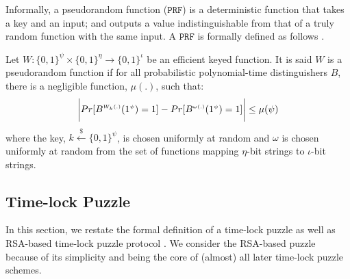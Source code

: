 Informally, a pseudorandom function ($\mathtt{PRF}$) is a deterministic function that takes a key and an input; and outputs a value  indistinguishable from that of  a truly random function with the same input.   A $\mathtt{PRF}$ is formally defined as follows \cite{DBLP:books/crc/KatzLindell2007}. 
\begin{definition} Let $W:\{0,1\}^{\scriptscriptstyle\psi}\times \{0,1\}^{\scriptscriptstyle \eta}\rightarrow \{0,1\}^{\scriptscriptstyle  \iota}$ be an efficient  keyed function. It is said $W$ is a pseudorandom function if for all probabilistic polynomial-time distinguishers $B$, there is a negligible function, $\mu(.)$, such that:
\begin{equation*}
\small{
\bigg | Pr[B^{\scriptscriptstyle W_{k}(.)}(1^{\scriptscriptstyle \psi})=1]- Pr[B^{\scriptscriptstyle \omega(.)}(1^{\scriptscriptstyle \psi})=1] \bigg |\leq \mu(\psi)
}
\end{equation*}
where  the key, $k\stackrel{\scriptscriptstyle\$}\leftarrow\{0,1\}^{\scriptscriptstyle\psi}$, is chosen uniformly at random and $\omega$ is chosen uniformly at random from the set of functions mapping $\eta$-bit strings to $\iota$-bit strings. 
\end{definition}



\vspace{-3mm}
 
\subsection{ Time-lock  Puzzle}\label{Time-lock-Encryption} 

\vspace{-2mm}

In this section, we restate the formal definition of a time-lock puzzle as well as RSA-based  time-lock puzzle protocol \cite{Rivest:1996:TPT:888615}. We consider the RSA-based puzzle because of its simplicity and  being the core of (almost) all later time-lock puzzle schemes.

\vspace{-1mm}

